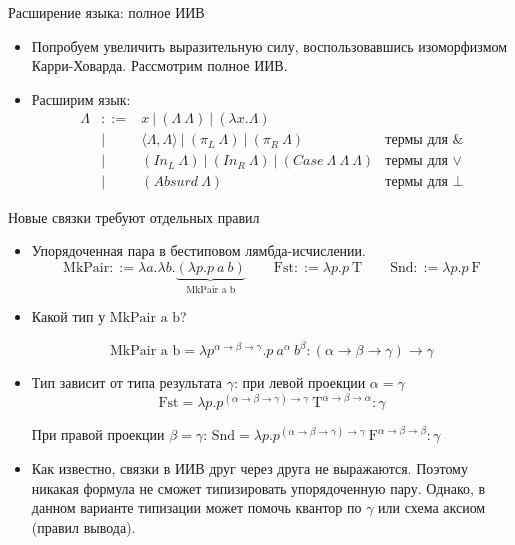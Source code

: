 \documentclass[aspectratio=169]{beamer}
\begin{document}
\begin{frame}{Расширение языка: полное ИИВ}
\begin{itemize}
\item Попробуем увеличить выразительную силу, воспользовавшись изоморфизмом Карри-Ховарда. Рассмотрим полное ИИВ.
\item Расширим язык: $$\begin{array}{rcll}\Lambda &::=& x\ |\ (\Lambda\ \Lambda)\ |\ (\lambda x.\Lambda)\ \\
& | & \langle\Lambda,\Lambda\rangle\ |\ (\pi_L\ \Lambda)\ |\ (\pi_R\ \Lambda) & \text{термы для }\&\\
& | & (In_L\ \Lambda)\ |\ (In_R\ \Lambda)\ |\ (Case\ \Lambda\ \Lambda\ \Lambda) & \text{термы для }\vee\\
& | &(Absurd\ \Lambda) & \text{термы для }\bot
\end{array}$$
\end{itemize}

\end{frame}

\begin{frame}{Новые связки требуют отдельных правил}
\begin{itemize}\item Упорядоченная пара в бестиповом лямбда-исчислении.
$$\text{MkPair} ::= \lambda a.\lambda b.\underbrace{\left(\lambda p.p\ a\ b\right)}_{\text{MkPair a b}}
\quad\quad\text{Fst} ::= \lambda p.p\ \text{T}
\quad\quad\text{Snd} ::= \lambda p.p\ \text{F}$$
\item Какой тип у $\text{MkPair a b}$?

$$\text{MkPair a b} = \lambda p^{\alpha\rightarrow\beta\rightarrow\gamma}.p\ a^{\alpha}\ b^{\beta} : (\alpha\rightarrow\beta\rightarrow\gamma)\rightarrow\gamma$$

\item Тип зависит от типа результата $\gamma$: при левой проекции $\alpha = \gamma$ $$\text{Fst} = \lambda p.p^{(\alpha\rightarrow\beta\rightarrow\gamma)\rightarrow\gamma}\ \text{T}^{\alpha\rightarrow\beta\rightarrow\alpha} : \gamma$$

При правой проекции $\beta = \gamma$: $\text{Snd} = \lambda p.p^{(\alpha\rightarrow\beta\rightarrow\gamma)\rightarrow\gamma}\ \text{F}^{\alpha\rightarrow\beta\rightarrow\beta} : \gamma$

\item Как известно, связки в ИИВ друг через друга не выражаются. Поэтому никакая формула не сможет типизировать упорядоченную пару. 
Однако, в данном варианте типизации может помочь квантор по $\gamma$ или схема аксиом (правил вывода).
\end{itemize}
\end{frame}
\end{document}
